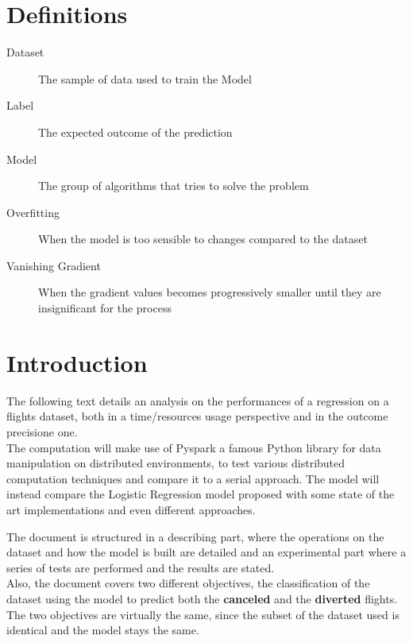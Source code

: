 \documentclass[
	letterpaper, %
	10pt, %
]{class}
\begin{document}
\section{Definitions}\label{definitions} %

\begin{description}
    \item[Dataset] The sample of data used to train the Model
    \item[Label] The expected outcome of the prediction
    \item[Model] The group of algorithms that tries to solve the problem
    \item[Overfitting] When the model is too sensible to changes compared to the dataset
    \item[Vanishing Gradient] When the gradient values becomes progressively smaller until they are insignificant for the process
\end{description}


\section{Introduction}

The following text details an analysis on the performances of a regression on a flights dataset, both in a time/resources usage perspective and in the outcome precisione one.\\
The computation will make use of Pyspark a famous Python library for data manipulation on distributed environments, to test various distributed computation techniques and compare it to a serial approach.
The model will instead compare the Logistic Regression model proposed with some state of the art implementations and even different approaches.

The document is structured in a describing part, where the operations on the dataset and how the model is built are detailed and an experimental part where a series of tests are performed and the results are stated.\\

Also, the document covers two different objectives, the classification of the dataset using the model to predict both the \textbf{canceled} and the \textbf{diverted} flights.\\
The two objectives are virtually the same, since the subset of the dataset used is identical and the model stays the same.\\
\end{document}
